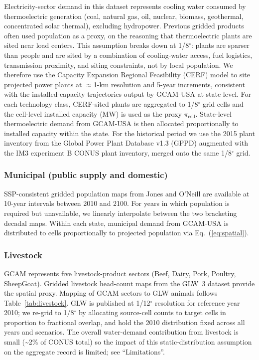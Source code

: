 \documentclass[fleqn,10pt]{wlscirep}
\begin{document}
Electricity-sector demand in this dataset represents cooling water consumed by thermoelectric generation (coal, natural gas, oil, nuclear, biomass, geothermal, concentrated solar thermal), excluding hydropower. Previous gridded products often used population as a proxy, on the reasoning that thermoelectric plants are sited near load centers. 
This assumption breaks down at 1/8$^{\circ}$: plants are sparser than people and are sited by a combination of cooling-water access, fuel logistics, transmission proximity, and siting constraints, not by local population. We therefore use the Capacity Expansion Regional Feasibility (CERF)\cite{Vernon2021} model to site projected power plants at $\approx$1-km resolution and 5-year increments, consistent with the installed-capacity trajectories output by GCAM-USA at state level. For each technology class, CERF-sited plants are aggregated to 1/8$^{\circ}$ grid cells and the cell-level installed capacity (MW) is used as the proxy $\pi_{\mathrm{cell}}$. State-level thermoelectric demand from GCAM-USA is then allocated proportionally to installed capacity within the state. For the historical period we use the 2015 plant inventory from the Global Power Plant Database v1.3 (GPPD) augmented with the IM3 experiment B CONUS plant inventory, merged onto the same 1/8$^{\circ}$ grid.

\subsubsection*{Municipal (public supply and domestic)}

SSP-consistent gridded population maps from Jones and O'Neill\cite{Jones_2016} are available at 10-year intervals between 2010 and 2100. For years in which population is required but unavailable, we linearly interpolate between the two bracketing decadal maps. Within each state, municipal demand from GCAM-USA is distributed to cells proportionally to projected population via Eq.~(\ref{eq:spatial}).

\subsubsection*{Livestock}

GCAM represents five livestock-product sectors (Beef, Dairy, Pork, Poultry, SheepGoat). Gridded livestock head-count maps from the GLW~3 dataset\cite{Gilbert2018} provide the spatial proxy. Mapping of GCAM sectors to GLW animals follows Table~\ref{tab:livestock}. GLW is published at 1/12$^{\circ}$ resolution for reference year 2010; we re-grid to 1/8$^{\circ}$ by allocating source-cell counts to target cells in proportion to fractional overlap, and hold the 2010 distribution fixed across all years and scenarios. The overall water-demand contribution from livestock is small (\textasciitilde2\% of CONUS total) so the impact of this static-distribution assumption on the aggregate record is limited; see ``Limitations''.
\end{document}

